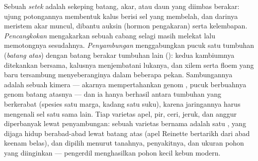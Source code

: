 \begin{proposition}\label{prop:b2:asexual-reproduction:horticulture}
Sebuah \emph{setek} adalah sekeping batang, akar, atau daun yang
diimbas berakar: ujung potongannya membentuk kalus berisi sel yang
membelah, dan darinya meristem akar muncul, dibantu auksin (hormon
pengakaran) serta kelembapan. \emph{Pencangkokan} mengakarkan sebuah
cabang selagi masih melekat lalu memotongnya sesudahnya.
\emph{Penyambungan} menggabungkan pucuk satu tumbuhan (\emph{batang
atas}) dengan batang berakar tumbuhan lain (\emph{}):
kedua kambiumnya ditekankan bersama, kalusnya menjembatani lukanya, dan
xilem serta floem yang baru tersambung menyeberanginya dalam beberapa
pekan. Sambungannya adalah sebuah kimera --- akarnya mempertahankan
genom , pucuk berbuahnya genom batang atasnya --- dan ia
hanya berhasil antara tumbuhan yang berkerabat (spesies satu marga,
kadang satu suku), karena jaringannya harus mengenali sel satu sama
lain. Tiap varietas apel, pir, ceri, jeruk, dan anggur diperbanyak
lewat penyambungan: sebuah varietas bernama adalah satu , yang
dijaga hidup berabad-abad lewat batang atas (apel Reinette bertarikh
dari abad keenam belas), dan  dipilih menurut tanahnya,
penyakitnya, dan ukuran pohon yang diinginkan ---  pengerdil
menghasilkan pohon kecil kebun modern.
\end{proposition}

